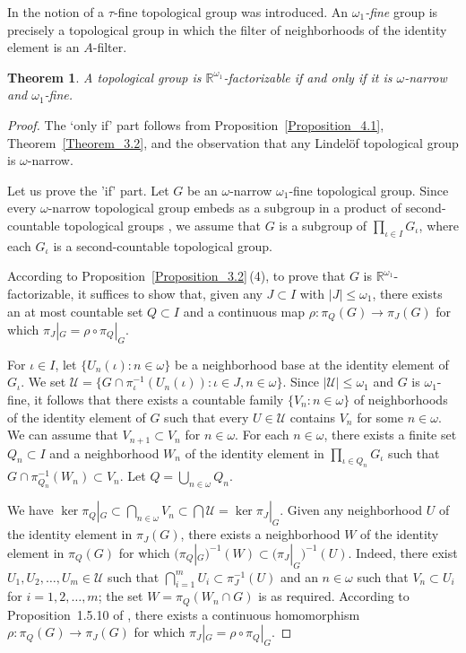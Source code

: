 \documentclass[a4paper,12pt]{amsart}
\newtheorem{theorem}{Theorem}[section]
\theoremstyle{definition}
\theoremstyle{remark}
\begin{document}
In \cite{HPTZ} the notion of a $\tau$-fine topological group was introduced. An {\em $\omega_1$-fine} group is precisely a topological group in which the filter of neighborhoods of the identity element is an $A$-filter. 

\begin{theorem}
\label{Theorem_5.3}
A topological group is $\mathbb R^{\omega_1}$-factorizable if and only if it is $\omega$-narrow 
and $\omega_1$-fine.
\end{theorem}

\begin{proof}
The `only if' part follows from Proposition~\ref{Proposition_4.1}, Theorem~\ref{Theorem_3.2}, 
and the observation that any Lindel\"of topological group is $\omega$-narrow.

Let us prove the 'if' part. Let $G$ be an $\omega$-narrow $\omega_1$-fine topological group.
Since every $\omega$-narrow topological group embeds as a subgroup in a product of second-countable topological groups \cite[Theorem 3.4.23]{A-T}, we assume that $G$ is a subgroup of $\prod_{\iota\in I}G_\iota$, where each $G_\iota$ is a second-countable topological group.

According to Proposition~\ref{Proposition_3.2}\,(4), to prove that $G$ is $\mathbb R^{\omega_1}$-factorizable, 
it suffices to show that, given any $J\subset I$ with $|J|\le \omega_1$,
there exists an at most countable set $Q\subset I$ and a continuous map $\rho\colon \pi_Q(G)\to \pi_J(G)$
for which $\pi_J|_G = \rho\circ \pi_Q|_G$.

For ${\iota\in I}$, let $\{U_n(\iota):n\in\omega\}$ be a neighborhood base at the identity element of
$G_\iota$. We set $\mathscr U=\{G\cap \pi^{-1}_\iota(U_n(\iota)): \iota\in J, n\in\omega\}$.
Since $|\mathscr U|\leq\omega_1$ and $G$ is $\omega_1$-fine, it follows that 
there exists a countable family $\{V_n: n\in\omega\}$ of neighborhoods 
of the identity element of $G$ such that every  $U\in \mathscr U$ contains $V_n$  
for some $n\in\omega$. 
We can assume that $V_{n+1}\subset V_n$ for $n\in\omega$.
For each $n\in\omega$, there exists a finite set $Q_n\subset I$ and a neighborhood 
$W_n$  of the identity element in $\prod_{\iota\in Q_n}G_\iota$ such that 
$G\cap \pi_{Q_n}^{-1}(W_n)\subset V_n$. Let $Q=\bigcup_{n\in\omega}Q_n$.

We have $\ker \pi_Q|_{G}\subset \bigcap_{n\in\omega}V_n\subset \bigcap \mathscr U = \ker \pi_J|_{G}$. 
Given any neighborhood $U$ of the identity element in $\pi_J(G)$, there exists a neighborhood $W$ of the 
identity element in $\pi_Q(G)$ for which $\bigl(\pi_Q|_G\bigr)^{-1}(W)\subset \bigl(\pi_J|_G\bigr)^{-1}(U)$. 
Indeed, there exist $U_1,U_2,\dots, U_m\in \mathscr U$ such that $\bigcap_{i=1}^m U_i\subset \pi_J^{-1}(U)$ and 
an $n\in \omega$ such that $V_n\subset U_i$ for $i=1,2,\dots,m$; the set 
$W=\pi_Q(W_n\cap G)$ is as required. According to Proposition~1.5.10 of \cite{A-T}, there 
exists a continuous homomorphism 
$\rho\colon \pi_Q(G)\to \pi_J(G)$ for which $\pi_J|_G = \rho\circ \pi_Q|_G$.
\end{proof}
\end{document}
